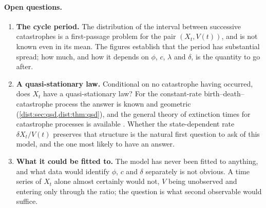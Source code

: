 \paragraph{Open questions.}\label{var:rem:open-rrrr}
\begin{enumerate}[leftmargin=1.6em,itemsep=0.2em,topsep=0.2em]
\item \textbf{The cycle period.} The distribution of the interval between
successive catastrophes is a first-passage problem for the pair $(X_t,V(t))$,
and is not known even in its mean. The figures establish that the period has
substantial spread; how much, and how it depends on $\phi$, $c$, $\lambda$
and $\delta$, is the quantity to go after.
\item \textbf{A quasi-stationary law.} Conditional on no catastrophe having
occurred, does $X_t$ have a quasi-stationary law? For the constant-rate
birth--death--catastrophe process the answer is known and geometric
(\cref{dist:sec:qsd,dist:thm:qsd}), and the general theory of extinction
times for catastrophe processes is available
\cite{brockwell1985extinction,cairns2004extinction}. Whether the
state-dependent rate $\delta X_t/V(t)$ preserves that structure is the
natural first question to ask of this model, and the one most likely to have
an answer.
\item \textbf{What it could be fitted to.} The model has never been fitted to
anything, and what data would identify $\phi$, $c$ and $\delta$ separately is
not obvious. A time series of $X_t$ alone almost certainly would not, $V$
being unobserved and entering only through the ratio; the question is what
second observable would suffice.
\end{enumerate}

\FloatBarrier
